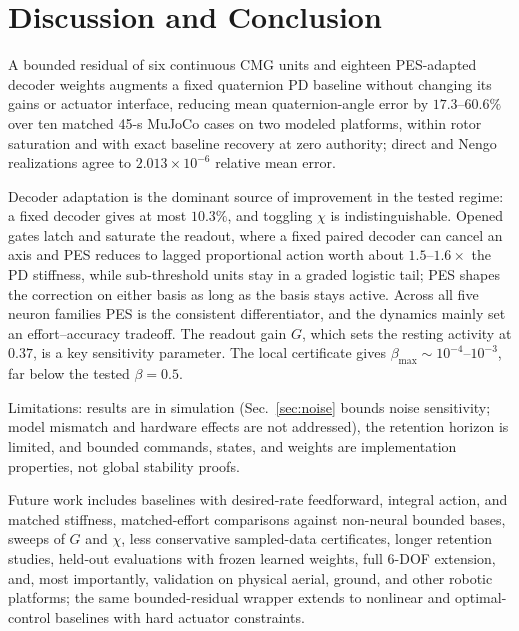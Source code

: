 \documentclass[letterpaper, 10 pt, conference]{ieeeconf}
\begin{document}
\section{Discussion and Conclusion}
\label{sec:conclusion}
A bounded residual of six continuous CMG units and eighteen PES-adapted decoder weights augments a fixed quaternion PD baseline without changing its gains or actuator interface, reducing mean quaternion-angle error by $17.3$--$60.6\%$ over ten matched 45-s MuJoCo cases on two modeled platforms, within rotor saturation and with exact baseline recovery at zero authority; direct and Nengo realizations agree to $2.013\times10^{-6}$ relative mean error.

Decoder adaptation is the dominant source of improvement in the tested regime: a fixed decoder gives at most $10.3\%$, and toggling $\chi$ is indistinguishable. Opened gates latch and saturate the readout, where a fixed paired decoder can cancel an axis and PES reduces to lagged proportional action worth about $1.5$--$1.6\times$ the PD stiffness, while sub-threshold units stay in a graded logistic tail; PES shapes the correction on either basis as long as the basis stays active. Across all five neuron families PES is the consistent differentiator, and the dynamics mainly set an effort--accuracy tradeoff. The readout gain $G$, which sets the resting activity at $0.37$, is a key sensitivity parameter. The local certificate gives $\beta_{\max}\sim10^{-4}$--$10^{-3}$, far below the tested $\beta=0.5$.

Limitations: results are in simulation (Sec.~\ref{sec:noise} bounds noise sensitivity; model mismatch and hardware effects are not addressed), the retention horizon is limited, and bounded commands, states, and weights are implementation properties, not global stability proofs.

Future work includes baselines with desired-rate feedforward, integral action, and matched stiffness, matched-effort comparisons against non-neural bounded bases, sweeps of $G$ and $\chi$, less conservative sampled-data certificates, longer retention studies, held-out evaluations with frozen learned weights, full 6-DOF extension, and, most importantly, validation on physical aerial, ground, and other robotic platforms; the same bounded-residual wrapper extends to nonlinear and optimal-control baselines with hard actuator constraints.





\end{document}
